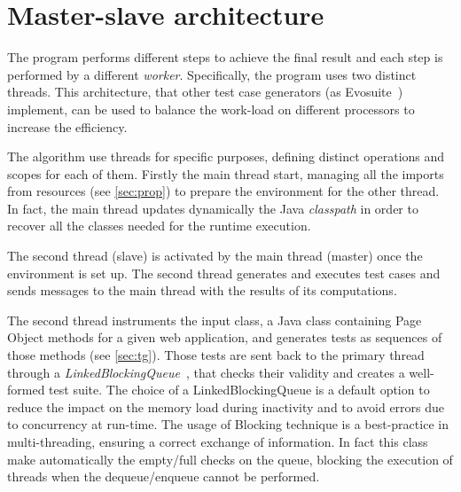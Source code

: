 \section{Master-slave architecture }\label{sec:MSArch}
The program performs different steps to achieve the final result and each step is performed by a different \textit{worker}. Specifically, the program uses two distinct threads. This architecture, that other test case generators (as Evosuite~\cite{evosuite}) implement, can be used to balance the work-load on different processors to increase the efficiency.
 

The algorithm use threads for specific purposes, defining distinct operations and scopes for each of them. Firstly the main thread start, managing all the imports from resources (see \autoref{sec:prop}) to prepare the environment for the other thread. In fact, the main thread updates dynamically the Java \textit{classpath} in order to recover all the classes needed for the runtime execution.

The second thread (slave) is activated by the main thread (master) once the environment is set up. The second thread generates and executes test cases and sends messages to the main thread with the results of its computations.

The second thread instruments the input class, a Java class containing Page Object methods for a given web application, and generates tests as sequences of those methods (see \autoref{sec:tg}). Those tests are sent back to the primary thread through a \textit{LinkedBlockingQueue}~\cite{linkedBlockingQueue}, that checks their validity and creates a well-formed test suite. The choice of a LinkedBlockingQueue is a default option to reduce the impact on the memory load during inactivity and to avoid errors due to concurrency at run-time.
The usage of Blocking technique is a best-practice in multi-threading, ensuring a correct exchange of information.
In fact this class make automatically the empty/full checks on the queue, blocking the execution of threads when the dequeue/enqueue cannot be performed.